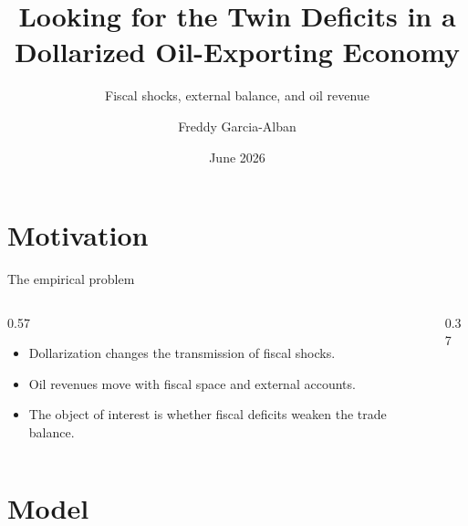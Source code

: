 \documentclass[aspectratio=169,10pt]{beamer}
\title[Looking for Twin Deficits]{Looking for the Twin Deficits in a Dollarized Oil-Exporting Economy}
\subtitle{Fiscal shocks, external balance, and oil revenue}
\author{Freddy Garcia-Alban}
\institute{Research seminar}
\date{June 2026}
\begin{document}
\begin{frame}[plain]
  \titlepage
\end{frame}

\section{Motivation}

\begin{frame}{The empirical problem}
  \begin{columns}[T,onlytextwidth]
    \begin{column}{0.57\textwidth}
      \begin{itemize}
        \item Dollarization changes the transmission of fiscal shocks.
        \item Oil revenues move with fiscal space and external accounts.
        \item The object of interest is whether fiscal deficits weaken the trade balance.
      \end{itemize}
    \end{column}
    \begin{column}{0.37\textwidth}
      \vspace{0.10cm}
      \vspace{0.10cm}
    \end{column}
  \end{columns}

\end{frame}

\section{Model}
\end{document}
